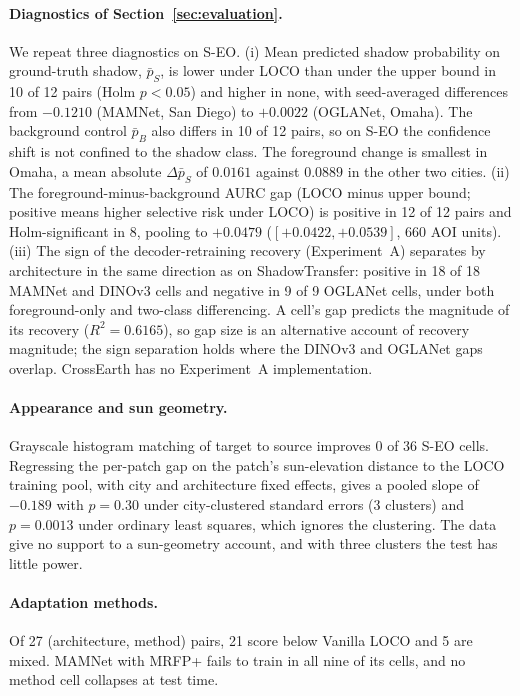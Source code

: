 \paragraph{Diagnostics of Section~\ref{sec:evaluation}.} We repeat three diagnostics on
S-EO. (i) Mean predicted shadow probability on ground-truth shadow, $\bar{p}_S$, is lower
under LOCO than under the upper bound in 10 of 12 pairs (Holm $p < 0.05$) and higher in
none, with seed-averaged differences from $-0.1210$ (MAMNet, San Diego) to $+0.0022$
(OGLANet, Omaha). The background control $\bar{p}_B$ also differs in 10 of 12 pairs, so on
S-EO the confidence shift is not confined to the shadow class. The foreground change is
smallest in Omaha, a mean absolute $\Delta\bar{p}_S$ of $0.0161$ against $0.0889$ in the
other two cities. (ii) The foreground-minus-background AURC gap (LOCO minus upper bound;
positive means higher selective risk under LOCO) is positive in 12 of 12 pairs and
Holm-significant in 8, pooling to $+0.0479$ ($[+0.0422, +0.0539]$, 660 AOI units).
(iii) The sign of the decoder-retraining recovery (Experiment~A) separates by architecture
in the same direction as on ShadowTransfer: positive in 18 of 18 MAMNet and DINOv3 cells and
negative in 9 of 9 OGLANet cells, under both foreground-only and two-class differencing. A cell's gap
predicts the magnitude of its recovery ($R^2 = 0.6165$), so gap size is an alternative account
of recovery magnitude; the sign separation holds where the DINOv3 and OGLANet gaps overlap. CrossEarth has no Experiment~A
implementation.

\paragraph{Appearance and sun geometry.} Grayscale histogram matching of target to source
improves 0 of 36 S-EO cells. Regressing the per-patch gap on the patch's sun-elevation
distance to the LOCO training pool, with city and architecture fixed effects, gives a
pooled slope of $-0.189$ with $p = 0.30$ under city-clustered standard errors (3 clusters)
and $p = 0.0013$ under ordinary least squares, which ignores the clustering. The data give no
support to a sun-geometry account, and with three clusters the test has little power.

\paragraph{Adaptation methods.} Of 27 (architecture, method) pairs, 21 score below Vanilla
LOCO and 5 are mixed. MAMNet with MRFP+ fails to train in all nine of its cells, and no
method cell collapses at test time.

